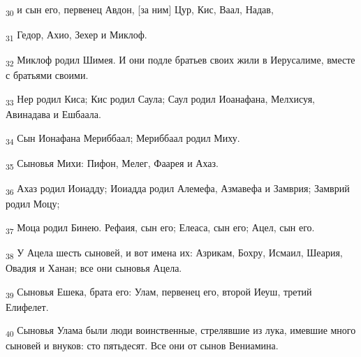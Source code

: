 \begin{tcolorbox}
\textsubscript{30} и сын его, первенец Авдон, [за ним] Цур, Кис, Ваал, Надав,
\end{tcolorbox}
\begin{tcolorbox}
\textsubscript{31} Гедор, Ахио, Зехер и Миклоф.
\end{tcolorbox}
\begin{tcolorbox}
\textsubscript{32} Миклоф родил Шимея. И они подле братьев своих жили в Иерусалиме, вместе с братьями своими.
\end{tcolorbox}
\begin{tcolorbox}
\textsubscript{33} Нер родил Киса; Кис родил Саула; Саул родил Иоанафана, Мелхисуя, Авинадава и Ешбаала.
\end{tcolorbox}
\begin{tcolorbox}
\textsubscript{34} Сын Ионафана Мериббаал; Мериббаал родил Миху.
\end{tcolorbox}
\begin{tcolorbox}
\textsubscript{35} Сыновья Михи: Пифон, Мелег, Фаарея и Ахаз.
\end{tcolorbox}
\begin{tcolorbox}
\textsubscript{36} Ахаз родил Иоиадду; Иоиадда родил Алемефа, Азмавефа и Замврия; Замврий родил Моцу;
\end{tcolorbox}
\begin{tcolorbox}
\textsubscript{37} Моца родил Бинею. Рефаия, сын его; Елеаса, сын его; Ацел, сын его.
\end{tcolorbox}
\begin{tcolorbox}
\textsubscript{38} У Ацела шесть сыновей, и вот имена их: Азрикам, Бохру, Исмаил, Шеария, Овадия и Ханан; все они сыновья Ацела.
\end{tcolorbox}
\begin{tcolorbox}
\textsubscript{39} Сыновья Ешека, брата его: Улам, первенец его, второй Иеуш, третий Елифелет.
\end{tcolorbox}
\begin{tcolorbox}
\textsubscript{40} Сыновья Улама были люди воинственные, стрелявшие из лука, имевшие много сыновей и внуков: сто пятьдесят. Все они от сынов Вениамина.
\end{tcolorbox}
